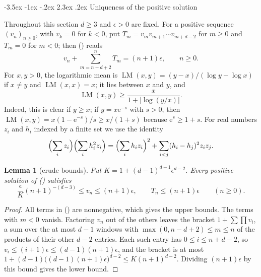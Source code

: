 \documentclass[twoside,10pt]{article}
\makeatletter
\numberwithin{equation}{section}
\theoremstyle{slbody}
\newtheorem{lemma}[theorem]{Lemma}
\theoremstyle{remark}
\newcommand{\e}{\mathrm e}
\renewcommand{\section}{%
  \@startsection{section}{1}{\z@}%
    {-3.5ex \@plus -1ex \@minus -.2ex}%
    {2.3ex \@plus .2ex}%
    {\normalfont\large\bfseries}}
\renewcommand{\eqref}[1]{%
  \textup{{\normalfont(\oldstylenums{\ref{#1}}}\normalfont)}}
\makeatother
\begin{document}
\section{Uniqueness of the positive solution}\label{sec:unique}

Throughout this section \(d\geq3\) and \(\epsilon>0\) are fixed.  For a
positive sequence \((v_n)_{n\geq0}\), with \(v_k=0\) for \(k<0\), put
\(T_m=v_mv_{m+1}\cdots v_{m+d-2}\) for \(m\geq0\) and \(T_m=0\) for
\(m<0\); then \eqref{eq:general-recurrence} reads
\begin{equation}
v_n+\sum_{m=n-d+2}^{n}T_m=(n+1)\epsilon,
\qquad n\geq0.
\label{eq:integrated}
\end{equation}
For \(x,y>0\), the logarithmic mean is
\(\operatorname{LM}(x,y)=(y-x)/(\log y-\log x)\) if \(x\neq y\) and
\(\operatorname{LM}(x,x)=x\); it lies between \(x\) and \(y\), and
\begin{equation}
\operatorname{LM}(x,y)\geq\frac{x}{1+|\log(y/x)|}.
\label{eq:lm-lower}
\end{equation}
Indeed, this is clear if \(y\geq x\); if \(y=x\e^{-s}\) with
\(s>0\), then \(\operatorname{LM}(x,y)=x(1-\e^{-s})/s
\geq x/(1+s)\) because \(\e^s\geq1+s\).  For real numbers \(z_i\) and
\(h_i\) indexed by a finite set we use the identity
\begin{equation}
\Bigl(\sum_iz_i\Bigr)\Bigl(\sum_ih_i^2z_i\Bigr)
=\Bigl(\sum_ih_iz_i\Bigr)^2+\sum_{i<j}(h_i-h_j)^2z_iz_j .
\label{eq:square-identity}
\end{equation}

\begin{lemma}[crude bounds]\label{lem:crude}
Put \(K=1+(d-1)^{d-1}\epsilon^{d-2}\).  Every positive solution of
\eqref{eq:integrated} satisfies
\[
\frac{\epsilon}{K}(n+1)^{-(d-3)}\leq v_n\leq(n+1)\epsilon,
\qquad
T_n\leq(n+1)\epsilon
\qquad(n\geq0).
\]
\end{lemma}

\begin{proof}
All terms in \eqref{eq:integrated} are nonnegative, which gives the
upper bounds.  The terms with \(m<0\) vanish.  Factoring \(v_n\) out of
the others leaves the bracket \(1+\sum\prod v_i\), a sum over the at
most \(d-1\) windows with \(\max(0,n-d+2)\leq m\leq n\) of the products
of their other \(d-2\) entries.  Each such entry has
\(0\leq i\leq n+d-2\), so \(v_i\leq(i+1)\epsilon\leq(d-1)(n+1)\epsilon\),
and the bracket is at most
\(1+(d-1)\bigl((d-1)(n+1)\epsilon\bigr)^{d-2}\leq K(n+1)^{d-2}\).
Dividing \((n+1)\epsilon\) by this bound gives the lower bound.
\end{proof}
\end{document}
